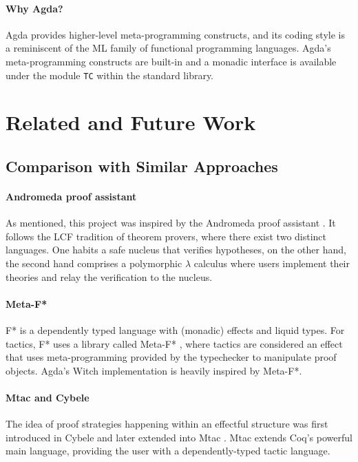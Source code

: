 \documentclass[sigconfl]{acmart}
\begin{document}
\paragraph{Why Agda?} Agda provides higher-level meta-programming constructs, and
its coding style is a reminiscent of the ML family of functional programming
languages. Agda's meta-programming constructs are built-in and a monadic
interface is available under the module \texttt{TC} within the standard library.

\section{Related and Future Work}

\subsection{Comparison with Similar Approaches}

\paragraph{Andromeda proof assistant} As mentioned, this project was inspired by the
Andromeda proof assistant \cite{Bauer2018, DBLP:conf/icms/BauerHP20}. It follows the LCF tradition of theorem provers,
where there exist two distinct languages. One habits a safe nucleus that
verifies hypotheses, on the other hand, the second hand comprises a polymorphic
$\lambda$ calculus where users implement their theories and relay the
verification to the nucleus.

\paragraph{Meta-F*} F* is a dependently typed language with (monadic) effects and liquid
types. For tactics, F* uses a library called Meta-F* \cite{MetaFstar}, where tactics are
considered an effect that uses meta-programming provided by the typechecker to
manipulate proof objects. Agda's Witch implementation is heavily inspired by Meta-F*.

\paragraph{Mtac and Cybele} The idea of proof strategies happening within an
effectful structure was first introduced in Cybele \cite{Claret2013} and later extended into Mtac \cite{Ziliani2013}.
Mtac extends Coq's powerful main language, providing the user with a
dependently-typed tactic language.
\end{document}
